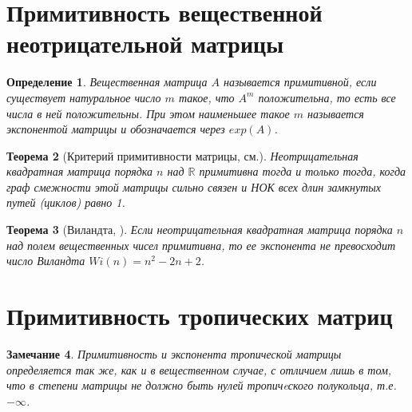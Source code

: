 \documentclass[12pt]{article}
\newtheorem{theorem}{Теорема}[section]
\newtheorem{definition}[theorem]{Определение}
\newtheorem{remark}[theorem]{Замечание}
\begin{document}
\section{Примитивность вещественной неотрицательной матрицы}
\begin{definition}
Вещественная матрица $A$ называется примитивной, если существует натуральное число $m$ такое, что $A^m$ положительна, то есть все числа в ней положительны. При этом наименьшее такое $m$ называется экспонентой матрицы и обозначается через $exp(A)$.
\end{definition}

\begin{theorem}[Критерий примитивности матрицы, см.\cite{Brualdi}]
 Неотрицательная квадратная матрица порядка $n$ над $\mathbb{R}$ примитивна тогда и только тогда, когда граф смежности этой матрицы сильно связен и НОК всех длин замкнутых путей (циклов) равно 1.
\end{theorem}
\begin{theorem}[Виландта, {\cite{wielandt}}]
Если неотрицательная квадратная матрица порядка $n$ над полем вещественных чисел примитивна, то ее экспонента не превосходит число Виландта $Wi(n) = n^2-2n+2$.
\end{theorem}

\section{Примитивность тропических матриц}
\begin{remark}
Примитивность и экспонента тропической матрицы определяется так же, как и в вещественном случае, с отличием лишь в том, что в степени матрицы не должно быть нулей тропичeского полукольца, т.е. $-\infty$.
\end{remark}
\end{document}
